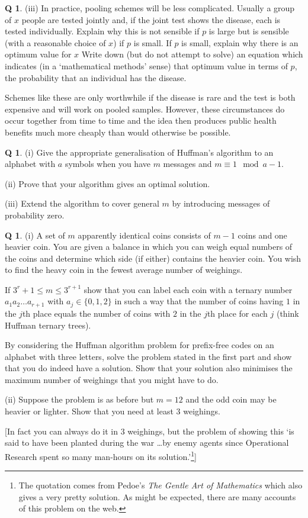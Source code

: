 \documentclass[12pt,a4paper]{article}
\theoremstyle{plain}
\theoremstyle{definition}
\newtheorem{question}[theorem]{Q}
\begin{document}
\begin{question}
(iii) In practice, pooling schemes will be less complicated.
Usually a group of $x$ people are tested jointly
and, if the joint test shows the disease, each is tested individually.
Explain why this is not sensible if $p$ is large
but is sensible (with a reasonable choice of $x$)
if $p$ is small.
If $p$ is small, explain why there is an optimum value for $x$
Write down (but do not 
attempt to solve)
an equation which indicates (in a `mathematical methods' sense)
that optimum value
in terms of $p$, the probability that an individual has the
disease. 

Schemes like these are only worthwhile if the disease is rare and
the test is both expensive and will work on pooled samples.
However, these circumstances do occur together from
time to time and the idea then produces public health
benefits much more cheaply than would otherwise be possible.
\end{question}
\begin{question}\label{C1.12} 
(i) Give the appropriate generalisation
of Huffman's algorithm to an alphabet with $a$ symbols
when you have $m$ messages and $m\equiv 1\mod{a-1}$.

(ii) Prove that your algorithm gives an optimal
solution.

(iii) Extend the algorithm to cover general $m$ by 
introducing messages of probability zero.
\end{question}  
\begin{question}\label{C1.13} 
(i) A set of $m$ apparently identical 
coins consists of $m-1$ coins and one heavier coin.
You are given a balance in which you can weigh
equal numbers of the coins and determine which side
(if either) contains the heavier coin.
You wish to find the heavy coin in the fewest
average number of weighings. 

If $3^{r}+1\leq m\leq 3^{r+1}$ show that you can label
each coin with a ternary number $a_{1}a_{2}\ldots a_{r+1}$
with $a_{j}\in\{0,1,2\}$ in such a way that
the number of coins
having 
$1$ in the $j$th place
equals the number of coins with $2$ in the $j$th place
for each $j$
(think Huffman ternary trees).

By considering the Huffman algorithm problem for
prefix-free codes on an alphabet with
three letters, solve the problem stated in the first 
part and show that you do indeed
have a solution. Show that your
solution also minimises the maximum number
of weighings that you might have to do.

(ii) Suppose the problem is as before but
$m=12$ and the odd coin may be heavier or lighter.
Show that you need at least $3$ weighings.

[In fact you can always do it in $3$ weighings, but
the problem of showing this
`is said to have been planted
during the war \dots by enemy agents
since Operational Research spent so many man-hours
on its solution.'\footnote{The quotation comes
from Pedoe's \emph{The Gentle Art of Mathematics}
which also gives a very pretty solution.
As might be expected, there are many accounts of this problem
on the web.}]
\end{question}
\end{document}
